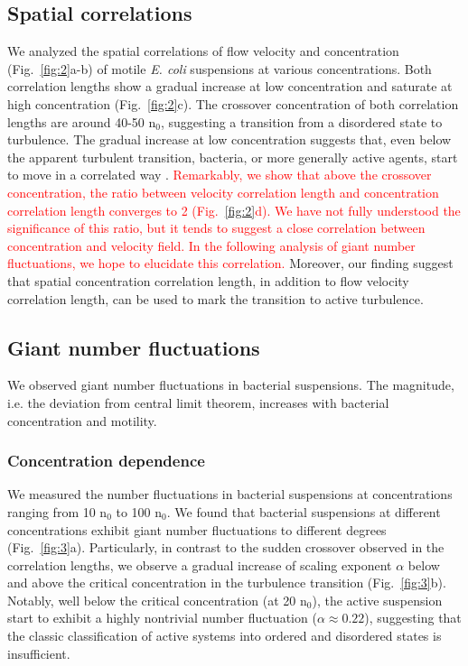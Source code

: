 \documentclass[twocolumn,aps,pre,amsmath,amssymb,floatfix,longbibliography]{revtex4-1}
\begin{document}
\subsection{Spatial correlations}
We analyzed the spatial correlations of flow velocity and concentration (Fig.~\ref{fig:2}a-b) of motile \textit{E. coli} suspensions at various concentrations. Both correlation lengths show a gradual increase at low concentration and saturate at high concentration (Fig.~\ref{fig:2}c). The crossover concentration of both correlation lengths are around 40-50 n$_0$, suggesting a transition from a disordered state to turbulence. The gradual increase at low concentration suggests that, even below the apparent turbulent transition, bacteria, or more generally active agents, start to move in a correlated way \cite{PhysRevLett.119.028005}. \textcolor{red}{Remarkably, we show that above the crossover concentration, the ratio between velocity correlation length and concentration correlation length converges to 2 (Fig.~\ref{fig:2}d). We have not fully understood the significance of this ratio, but it tends to suggest a close correlation between concentration and velocity field. In the following analysis of giant number fluctuations, we hope to elucidate this correlation.} Moreover, our finding suggest that spatial concentration correlation length, in addition to flow velocity correlation length\cite{Wensink14308, PhysRevLett.110.228102}, can be used to mark the transition to active turbulence.

\subsection{Giant number fluctuations}
We observed giant number fluctuations in bacterial suspensions. The magnitude, i.e. the deviation from central limit theorem, increases with bacterial concentration and motility.

\subsubsection{Concentration dependence}
We measured the number fluctuations in bacterial suspensions at concentrations ranging from 10 n$_0$ to 100 n$_0$.
 We found that bacterial suspensions at different concentrations exhibit giant number fluctuations to different degrees (Fig.~\ref{fig:3}a). Particularly, in contrast to the sudden crossover observed in the correlation lengths, we observe a gradual increase of scaling exponent $\alpha$ below and above the critical concentration in the turbulence transition (Fig.~\ref{fig:3}b). Notably, well below the critical concentration (at 20 n$_0$), the active suspension start to exhibit a highly nontrivial number fluctuation ($\alpha\approx0.22$), suggesting that the classic classification of active systems into ordered and disordered states is insufficient.
\end{document}
